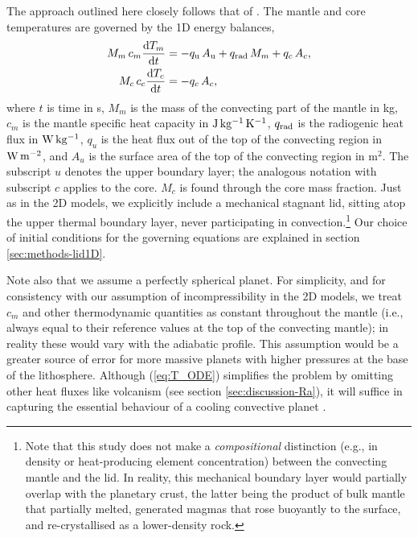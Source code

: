 \documentclass[trackchanges]{aastex63}
\begin{document}
The approach outlined here closely follows that of \citet{thiriet_scaling_2019}. The mantle and core temperatures are governed by the 1D energy balances,
\begin{align}\label{eq:T_ODE}
\begin{split}
M_m \, c_{m} \frac{{\rm d}T_m}{{\rm d}t} &= -q_{\rm u} \, A_{\rm u} + q_{\rm rad} \, M_m + q_c \, A_c, \\
M_c \, c_{c} \frac{{\rm d}T_c}{{\rm d}t} &= -q_c \, A_c,
\end{split}
\end{align}
where $t$ is time in s, $M_m$ is the mass of the convecting part of the mantle in kg, $c_{m}$ is the mantle specific heat capacity in ${\rm J\,kg^{-1}\,K^{-1}}$, $q_{\rm rad}$ is the radiogenic heat flux in ${\rm W\,kg^{-1}}$, $q_{u}$ is the heat flux out of the top of the convecting region in ${\rm W\,m^{-2}}$, and $A_{u}$ is the surface area of the top of the convecting region in m$^{2}$. The subscript $u$ denotes the upper boundary layer; the analogous notation with subscript $c$ applies to the core. $M_c$ is found through the core mass fraction. Just as in the 2D models, we explicitly include a mechanical stagnant lid, sitting atop the upper thermal boundary layer, never participating in convection.\footnote{Note that this study does not make a \emph{compositional} distinction (e.g., in density or heat-producing element concentration) between the convecting mantle and the lid. In reality, this mechanical boundary layer would partially overlap with the planetary crust, the latter being the product of bulk mantle that partially melted, generated magmas that rose buoyantly to the surface, and re-crystallised as a lower-density rock.} Our choice of initial conditions for the governing equations are explained in section \ref{sec:methods-lid1D}.

Note also that we assume a perfectly spherical planet. For simplicity, and for consistency with our assumption of incompressibility in the 2D models, we treat $c_m$ and other thermodynamic quantities as constant throughout the mantle (i.e., always equal to their reference values at the top of the convecting mantle); in reality these would vary with the adiabatic profile. This assumption would be a greater source of error for more massive planets with higher pressures at the base of the lithosphere. Although (\ref{eq:T_ODE}) simplifies the problem by omitting other heat fluxes like volcanism (see section \ref{sec:discussion-Ra}), it will suffice in capturing the essential behaviour of a cooling convective planet \citep{jaupart_temperatures_2015}.
\end{document}
